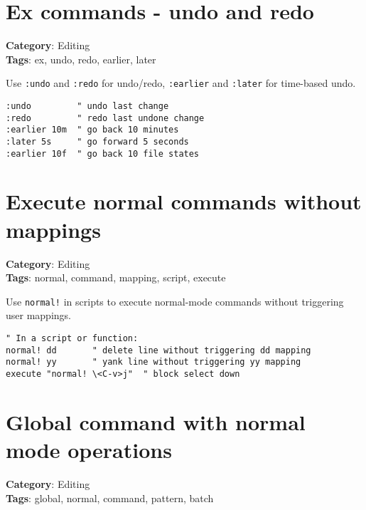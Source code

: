 {{{{\section{Ex commands - undo and redo}

\textbf{Category}: Editing\\ \textbf{Tags}: ex, undo, redo, earlier, later
\vspace{0.5cm}

Use {\footnotesize \Verb§:undo§} and {\footnotesize \Verb§:redo§} for undo/redo, {\footnotesize \Verb§:earlier§} and {\footnotesize \Verb§:later§} for time-based undo.

\begin{Exa*}{}
\begin{Verbatim}[fontsize=\footnotesize, breaklines, breakanywhere]
:undo         " undo last change
:redo         " redo last undone change
:earlier 10m  " go back 10 minutes
:later 5s     " go forward 5 seconds
:earlier 10f  " go back 10 file states
\end{Verbatim}
\end{Exa*}

\section{Execute normal commands without mappings}

\textbf{Category}: Editing\\ \textbf{Tags}: normal, command, mapping, script, execute
\vspace{0.5cm}

Use {\footnotesize \Verb§normal!§} in scripts to execute normal-mode commands without triggering user mappings.

\begin{Exa*}{}
\begin{Verbatim}[fontsize=\footnotesize, breaklines, breakanywhere]
" In a script or function:
normal! dd       " delete line without triggering dd mapping
normal! yy       " yank line without triggering yy mapping
execute "normal! \<C-v>j"  " block select down
\end{Verbatim}
\end{Exa*}

\section{Global command with normal mode operations}

\textbf{Category}: Editing\\ \textbf{Tags}: global, normal, command, pattern, batch
\vspace{0.5cm}

}}}}
